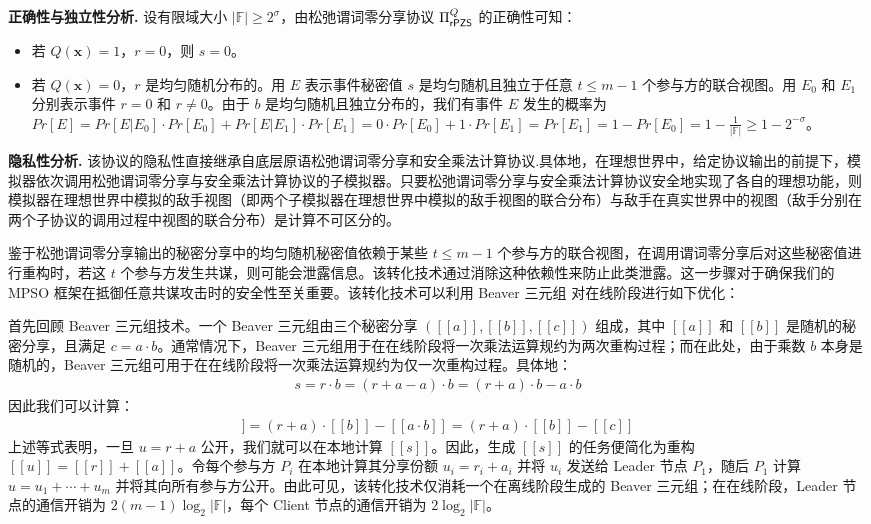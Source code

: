 \begin{trivlist}
\item \textbf{正确性与独立性分析.} 设有限域大小 $\lvert \mathbb{F} \rvert \ge 2^\sigma$，由松弛谓词零分享协议 $\Pi_\mathsf{rPZS}^Q$ 的正确性可知：
\begin{itemize}[itemsep=2pt,topsep=5pt,parsep=0pt,leftmargin=10pt]
    \item 若 $Q(\textbf{x}) = 1$，$r = 0$，则 $s = 0$。
    \item 若 $Q(\textbf{x}) = 0$，$r$ 是均匀随机分布的。用 $E$ 表示事件秘密值 $s$ 是均匀随机且独立于任意 $t \le m-1$ 个参与方的联合视图。用 $E_0$ 和 $E_1$ 分别表示事件 $r = 0$ 和 $r \ne 0$。由于 $b$ 是均匀随机且独立分布的，我们有事件 $E$ 发生的概率为 $Pr[E] = Pr[E \vert E_0] \cdot Pr[E_0] + Pr[E \vert E_1] \cdot Pr[E_1] = 0 \cdot Pr[E_0] + 1 \cdot Pr[E_1] = Pr[E_1] = 1 - Pr[E_0] = 1 - \frac{1}{\lvert \mathbb{F} \rvert} \ge 1- 2^{-\sigma}$。
\end{itemize}
\item \textbf{隐私性分析.} 该协议的隐私性直接继承自底层原语松弛谓词零分享和安全乘法计算协议.具体地，在理想世界中，给定协议输出的前提下，模拟器依次调用松弛谓词零分享与安全乘法计算协议的子模拟器。只要松弛谓词零分享与安全乘法计算协议安全地实现了各自的理想功能，则模拟器在理想世界中模拟的敌手视图（即两个子模拟器在理想世界中模拟的敌手视图的联合分布）与敌手在真实世界中的视图（敌手分别在两个子协议的调用过程中视图的联合分布）是计算不可区分的。
\end{trivlist}

鉴于松弛谓词零分享输出的秘密分享中的均匀随机秘密值依赖于某些 $t \le m-1$ 个参与方的联合视图，在调用谓词零分享后对这些秘密值进行重构时，若这 $t$ 个参与方发生共谋，则可能会泄露信息。该转化技术通过消除这种依赖性来防止此类泄露。这一步骤对于确保我们的 MPSO 框架在抵御任意共谋攻击时的安全性至关重要。该转化技术可以利用 Beaver 三元组 \cite{Beaver-CRYPTO-1991} 对在线阶段进行如下优化：

首先回顾 Beaver 三元组技术。一个 Beaver 三元组由三个秘密分享 $([\! [ a ] \!], [\! [ b ] \!], [\! [ c ] \!])$ 组成，其中 $[\! [ a ] \!]$ 和 $[\! [ b ] \!]$ 是随机的秘密分享，且满足 $c = a \cdot b$。通常情况下，Beaver 三元组用于在在线阶段将一次乘法运算规约为两次重构过程；而在此处，由于乘数 $b$ 本身是随机的，Beaver 三元组可用于在在线阶段将一次乘法运算规约为仅一次重构过程。具体地：
\begin{gather*}
s = r \cdot b = (r+a-a) \cdot b = (r+a) \cdot b - a \cdot b
\end{gather*}
因此我们可以计算：
\begin{gather*}
[\! [ s ] \!] = (r+a) \cdot [\! [ b ] \!] - [\! [ a \cdot b ] \!] = (r+a) \cdot [\! [ b ] \!] - [\! [ c ] \!]
\end{gather*}
上述等式表明，一旦 $u = r + a$ 公开，我们就可以在本地计算 $[\! [ s ] \!]$。因此，生成 $[\! [ s ] \!]$ 的任务便简化为重构 $[\! [ u ] \!] = [\! [ r ] \!] + [\! [ a ] \!]$。令每个参与方 $P_i$ 在本地计算其分享份额 $u_i = r_i + a_i$ 并将 $u_i$ 发送给 Leader 节点 $P_1$，随后 $P_1$ 计算 $u = u_1 + \cdots + u_m$ 并将其向所有参与方公开。由此可见，该转化技术仅消耗一个在离线阶段生成的 Beaver 三元组；在在线阶段，Leader 节点的通信开销为 $2 (m-1) \log_2\lvert \mathbb{F} \rvert$，每个 Client 节点的通信开销为 $2 \log_2\lvert \mathbb{F} \rvert$。

